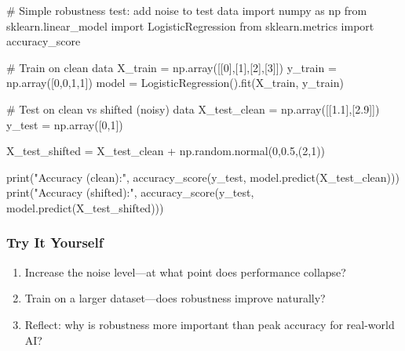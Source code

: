 \documentclass[
  letterpaper,
  DIV=11,
  numbers=noendperiod]{scrreprt}
\newenvironment{Shaded}{\begin{snugshade}}{\end{snugshade}}
\newcommand{\BuiltInTok}[1]{\textcolor[rgb]{0.00,0.23,0.31}{#1}}
\newcommand{\CommentTok}[1]{\textcolor[rgb]{0.37,0.37,0.37}{#1}}
\newcommand{\DecValTok}[1]{\textcolor[rgb]{0.68,0.00,0.00}{#1}}
\newcommand{\FloatTok}[1]{\textcolor[rgb]{0.68,0.00,0.00}{#1}}
\newcommand{\ImportTok}[1]{\textcolor[rgb]{0.00,0.46,0.62}{#1}}
\newcommand{\NormalTok}[1]{\textcolor[rgb]{0.00,0.23,0.31}{#1}}
\newcommand{\OperatorTok}[1]{\textcolor[rgb]{0.37,0.37,0.37}{#1}}
\newcommand{\StringTok}[1]{\textcolor[rgb]{0.13,0.47,0.30}{#1}}
\providecommand{\tightlist}{%
  \setlength{\itemsep}{0pt}\setlength{\parskip}{0pt}}
\begin{document}
\begin{Shaded}
\begin{Highlighting}[]
\CommentTok{\# Simple robustness test: add noise to test data}
\ImportTok{import}\NormalTok{ numpy }\ImportTok{as}\NormalTok{ np}
\ImportTok{from}\NormalTok{ sklearn.linear\_model }\ImportTok{import}\NormalTok{ LogisticRegression}
\ImportTok{from}\NormalTok{ sklearn.metrics }\ImportTok{import}\NormalTok{ accuracy\_score}

\CommentTok{\# Train on clean data}
\NormalTok{X\_train }\OperatorTok{=}\NormalTok{ np.array([[}\DecValTok{0}\NormalTok{],[}\DecValTok{1}\NormalTok{],[}\DecValTok{2}\NormalTok{],[}\DecValTok{3}\NormalTok{]])}
\NormalTok{y\_train }\OperatorTok{=}\NormalTok{ np.array([}\DecValTok{0}\NormalTok{,}\DecValTok{0}\NormalTok{,}\DecValTok{1}\NormalTok{,}\DecValTok{1}\NormalTok{])}
\NormalTok{model }\OperatorTok{=}\NormalTok{ LogisticRegression().fit(X\_train, y\_train)}

\CommentTok{\# Test on clean vs shifted (noisy) data}
\NormalTok{X\_test\_clean }\OperatorTok{=}\NormalTok{ np.array([[}\FloatTok{1.1}\NormalTok{],[}\FloatTok{2.9}\NormalTok{]])}
\NormalTok{y\_test }\OperatorTok{=}\NormalTok{ np.array([}\DecValTok{0}\NormalTok{,}\DecValTok{1}\NormalTok{])}

\NormalTok{X\_test\_shifted }\OperatorTok{=}\NormalTok{ X\_test\_clean }\OperatorTok{+}\NormalTok{ np.random.normal(}\DecValTok{0}\NormalTok{,}\FloatTok{0.5}\NormalTok{,(}\DecValTok{2}\NormalTok{,}\DecValTok{1}\NormalTok{))}

\BuiltInTok{print}\NormalTok{(}\StringTok{"Accuracy (clean):"}\NormalTok{, accuracy\_score(y\_test, model.predict(X\_test\_clean)))}
\BuiltInTok{print}\NormalTok{(}\StringTok{"Accuracy (shifted):"}\NormalTok{, accuracy\_score(y\_test, model.predict(X\_test\_shifted)))}
\end{Highlighting}
\end{Shaded}

\subsubsection{Try It Yourself}\label{try-it-yourself-87}

\begin{enumerate}
\def\labelenumi{\arabic{enumi}.}
\tightlist
\item
  Increase the noise level---at what point does performance collapse?
\item
  Train on a larger dataset---does robustness improve naturally?
\item
  Reflect: why is robustness more important than peak accuracy for
  real-world AI?
\end{enumerate}
\end{document}

